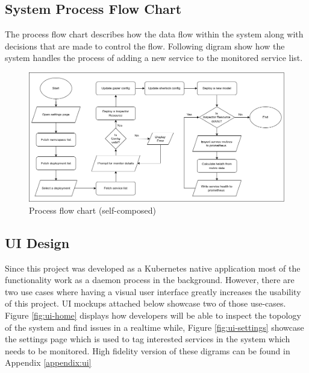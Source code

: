 \subsection{System Process Flow Chart}

The process flow chart describes how the data flow within the system along with decisions that are made to control the flow. Following digram show how the system handles the process of adding a new service to the monitored service list.

\begin{figure}[H]
    \includegraphics[width=16cm]{assets/system-design/process-flow-chart.png}
    \caption{Process flow chart (self-composed)}
\end{figure}

\subsection{UI Design}

Since this project was developed as a Kubernetes native application most of the functionality work as a daemon process in the background. However, there are two use cases where having a visual user interface greatly increases the usability of this project. UI mockups attached below showcase two of those use-cases. Figure \ref{fig:ui-home} displays how developers will be able to inspect the topology of the system and find issues in a realtime while, Figure \ref{fig:ui-settings} showcase the settings page which is used to tag interested services in the system which needs to be monitored. High fidelity version of these digrams can be found in Appendix \ref{appendix:ui}

